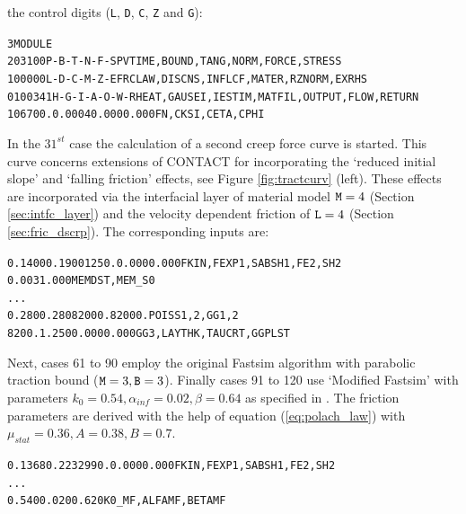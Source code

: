 \documentclass[12pt]{report}
\begin{document}
the control digits ({\tt L}, {\tt D}, {\tt C}, {\tt Z} and {\tt G}):
\begin{alltt}\small
 3 MODULE
  203100     P-B-T-N-F-S        PVTIME, BOUND , TANG  , NORM , FORCE, STRESS
  100000     L-D-C-M-Z-E        FRCLAW, DISCNS, INFLCF, MATER, RZNORM, EXRHS
 0100341   H-G-I-A-O-W-R  HEAT, GAUSEI, IESTIM, MATFIL, OUTPUT, FLOW, RETURN
 106700.      0.0004     0.000      0.000           FN, CKSI, CETA, CPHI
\end{alltt}
In the $31^{st}$ case the calculation of a second creep force curve is
started. This curve concerns extensions of CONTACT for incorporating the
`reduced initial slope' and `falling friction' effects, see Figure
\ref{fig:tractcurv} (left). These effects are incorporated via the
interfacial layer of material model ${\tt M}=4$ (Section
\ref{sec:intfc_layer}) and the velocity dependent friction of ${\tt L}=4$
(Section \ref{sec:fric_dscrp}). The corresponding inputs are:
\begin{alltt}\small
   0.1400     0.1900     1250.    0.000   0.000  FKIN, FEXP1,SABSH1,FE2,SH2
   0.003      1.000                              MEMDST, MEM_S0
...
   0.280      0.280      82000.   82000.         POISS 1,2,  GG 1,2
   8200.      1.250      0.000    0.000          GG3, LAYTHK, TAUCRT, GGPLST
\end{alltt}
Next, cases 61 to 90 employ the original Fastsim algorithm with parabolic
traction bound (${\tt M}=3, {\tt B}=3$). Finally cases 91 to 120 use
`Modified Fastsim' with parameters $k_0=0.54, \alpha_{inf}=0.02,
\beta=0.64$ as specified in \cite{Spiryagin2013}. The friction
parameters are derived with the help of equation (\ref{eq:polach_law})
with $\mu_{stat}=0.36, A=0.38, B=0.7$.
\begin{alltt}\small
   0.1368     0.2232      990.   0.000   0.000   FKIN, FEXP1,SABSH1,FE2,SH2
...
   0.540      0.020      0.620                   K0\_MF,ALFAMF,BETAMF
\end{alltt}
\end{document}
